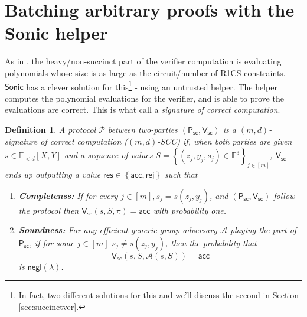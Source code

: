 \documentclass[11pt]{article}
\numberwithin{figure}{section} %
\newtheorem{dfn}[thm]{Definition}
\newcommand{\set}[1]{\ensuremath{\left\{#1\right\}}\xspace}
\newcommand{\F}{\ensuremath{\mathbb F}\xspace}
\newcommand{\adv}{\ensuremath{\mathcal A}\xspace}
\newcommand{\negl}{\ensuremath{\mathsf{negl}(\lambda)}\xspace}
\newcommand{\rej}{\ensuremath{\mathsf{rej}}\xspace}
\newcommand{\acc}{\ensuremath{\mathsf{acc}}\xspace}
\newcommand{\res}{\ensuremath{\mathsf{res}}\xspace}
\newcommand{\sett}[2]{\ensuremath{\set{#1}_{#2}}\xspace}
\newcommand{\prf}{\ensuremath{\pi}\xspace}
\newcommand{\sonic}{\ensuremath{\mathsf{Sonic}}\xspace}
\newcommand{\bivar}[1]{\ensuremath{\F_{< #1}[X,Y]}\xspace}
\newcommand{\prot}{\ensuremath{\mathscr{P}}\xspace}
\newcommand{\sigprv}{\ensuremath{\mathsf{P_{sc}}}\xspace}
\newcommand{\sigver}{\ensuremath{\mathsf{V_{sc}}}\xspace}
\begin{document}
\section{Batching arbitrary proofs with the Sonic helper}\label{sec:helpedver}
As in \cite{sonic}, the heavy/non-succinct part of the verifier computation is evaluating polynomials whose size is as large as the circuit/number of R1CS constraints.
\sonic has a clever solution for this\footnote{In fact, two different solutions for this and we'll discuss the second in Section \ref{sec:succinctver}.} - using an untrusted helper. The helper computes the polynomial evaluations for the verifier,
and is able to prove the evaluations are correct. This is what \cite{sonic} call a \emph{signature of correct computation}.
\begin{dfn}\label{dfn:batchsigs}
  A protocol \prot between two-parties $(\sigprv,\sigver)$ is a  \emph{$(m,d)$-signature of correct computation} ($(m,d)$-SCC) if, when both parties are given $s\in \bivar{d}$ and a sequence of values $S=\sett{(z_j,y_j,s_j)\in \F^3}{j\in [m]}$, \sigver ends up outputting a value $\res\in \set{\acc,\rej}$ such that 
%   
\begin{enumerate}
 \item \textbf{Completenss:} If for every $j\in [m], s_j = s(z_j,y_j)$,
 and $(\sigprv,\sigver)$ follow the protocol then
 $\sigver(s,S,\prf)=\acc$ with probability one.
 \item \textbf{Soundness:} For any efficient generic group adversary \adv playing the part of \sigprv, if for some $j\in [m]$
 $s_j \neq s(z_j,y_j)$, then the probability that
 \[\sigver(s,S,\adv(s,S))=\acc\]
 is \negl.
\end{enumerate}

\end{dfn}
\end{document}
